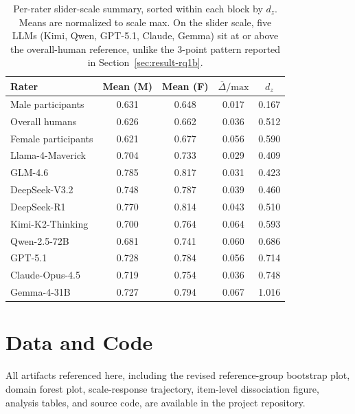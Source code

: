 \documentclass[a4paper,fleqn,review]{cas-sc}
\begin{document}
\begin{table}[h]
  \small
  \centering
  \begin{tabular}{lcccc}
    \toprule
    Rater & Mean (M) & Mean (F) & $\overline{\Delta}/\text{max}$ & $d_z$ \\
    \midrule
    Male participants    & 0.631 & 0.648 & 0.017 & 0.167 \\
    Overall humans       & 0.626 & 0.662 & 0.036 & 0.512 \\
    Female participants  & 0.621 & 0.677 & 0.056 & 0.590 \\
    \midrule
    Llama-4-Maverick     & 0.704 & 0.733 & 0.029 & 0.409 \\
    GLM-4.6              & 0.785 & 0.817 & 0.031 & 0.423 \\
    DeepSeek-V3.2        & 0.748 & 0.787 & 0.039 & 0.460 \\
    DeepSeek-R1          & 0.770 & 0.814 & 0.043 & 0.510 \\
    Kimi-K2-Thinking     & 0.700 & 0.764 & 0.064 & 0.593 \\
    Qwen-2.5-72B         & 0.681 & 0.741 & 0.060 & 0.686 \\
    GPT-5.1              & 0.728 & 0.784 & 0.056 & 0.714 \\
    Claude-Opus-4.5      & 0.719 & 0.754 & 0.036 & 0.748 \\
    Gemma-4-31B          & 0.727 & 0.794 & 0.067 & 1.016 \\
    \bottomrule
  \end{tabular}
  \caption{Per-rater slider-scale summary, sorted within each block by $d_z$. Means are normalized to scale max. On the slider scale, five LLMs (Kimi, Qwen, GPT-5.1, Claude, Gemma) sit at or above the overall-human reference, unlike the 3-point pattern reported in Section~\ref{sec:result-rq1b}.}
  \label{tab:dz-slider}
\end{table}

\section*{Data and Code}
All artifacts referenced here, including the revised reference-group bootstrap plot, domain forest plot, scale-response trajectory, item-level dissociation figure, analysis tables, and source code, are available in the project repository.
\end{document}
